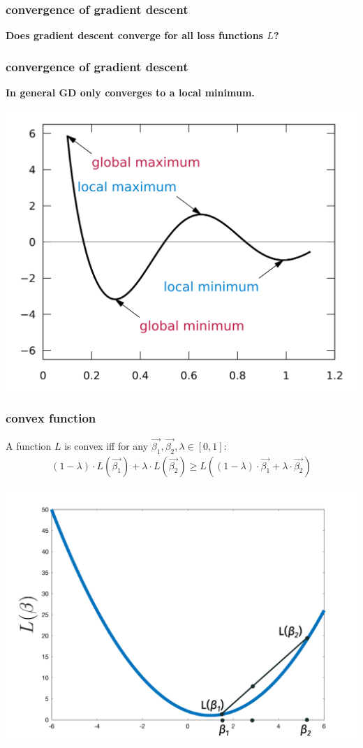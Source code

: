 \documentclass[handout,compress]{beamer}
\begin{document}
\begin{frame}[t]
	\frametitle{convergence of gradient descent}
	\begin{center}
		\textbf{Does gradient descent converge for all loss functions $L$?}
	\end{center}
\end{frame}

\begin{frame}[t]
	\frametitle{convergence of gradient descent}
	\begin{center}
		\textbf{In general GD only converges to a \alert{local minimum}.}
		
		\includegraphics[width=.7\textwidth]{local_min.png}
	\end{center}
\end{frame}

\begin{frame}[t]
	\frametitle{convex function}
		\begin{definition}[Convex]
		A function $L$ is convex iff for any $\vec{\beta_1}, \vec{\beta_2},\lambda \in [0,1]$:
		\begin{align*}
		(1-\lambda)\cdot L(\vec{\beta_1}) + \lambda \cdot L(\vec{\beta_2}) \geq L\left((1-\lambda)\cdot\vec{\beta_1}+ \lambda \cdot\vec{\beta_2}\right)
		\end{align*}
		\vspace{-1em}
	\end{definition}
\vspace{-2em}
\begin{center}
	\includegraphics[width=.75\textwidth]{convex.png}
\end{center}
\end{frame}
\end{document}
